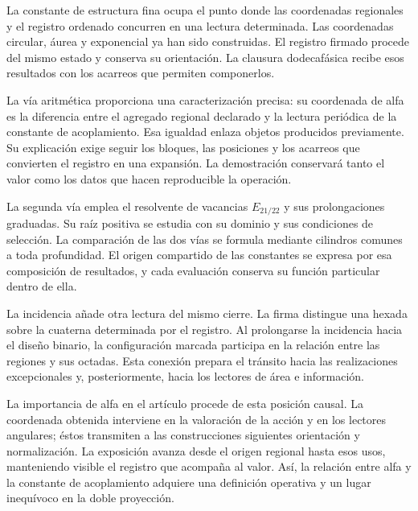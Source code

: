 
La constante de estructura fina ocupa el punto donde las coordenadas
regionales y el registro ordenado concurren en una lectura determinada.
Las coordenadas circular, áurea y exponencial ya han sido construidas.
El registro firmado procede del mismo estado y conserva su orientación.
La clausura dodecafásica recibe esos resultados con los acarreos que
permiten componerlos.

La vía aritmética proporciona una caracterización precisa: su coordenada
de alfa es la diferencia entre el agregado regional declarado y la
lectura periódica de la constante de acoplamiento. Esa igualdad enlaza
objetos producidos previamente. Su explicación exige seguir los bloques,
las posiciones y los acarreos que convierten el registro en una expansión.
La demostración conservará tanto el valor como los datos que hacen
reproducible la operación.

La segunda vía emplea el resolvente de vacancias \(E_{21/22}\) y
sus prolongaciones graduadas. Su raíz positiva se estudia con su dominio
y sus condiciones de selección. La comparación de las dos vías se
formula mediante cilindros comunes a toda profundidad.
El origen compartido de las
constantes se expresa por esa composición de resultados, y cada
evaluación conserva su función particular dentro de ella.

La incidencia añade otra lectura del mismo cierre. La firma distingue
una hexada sobre la cuaterna determinada por el registro. Al prolongarse
la incidencia hacia el diseño binario, la configuración marcada
participa en la relación entre las regiones y sus octadas. Esta
conexión prepara el tránsito hacia las realizaciones excepcionales y,
posteriormente, hacia los lectores de área e información.

La importancia de alfa en el artículo procede de esta posición causal. La
coordenada obtenida interviene en la valoración de la acción y en los
lectores angulares; éstos transmiten a las construcciones siguientes
orientación y normalización. La exposición avanza desde el origen
regional hasta esos usos, manteniendo visible el registro que acompaña
al valor. Así, la relación entre alfa y la constante de acoplamiento
adquiere una definición operativa y un lugar inequívoco en la doble
proyección.
